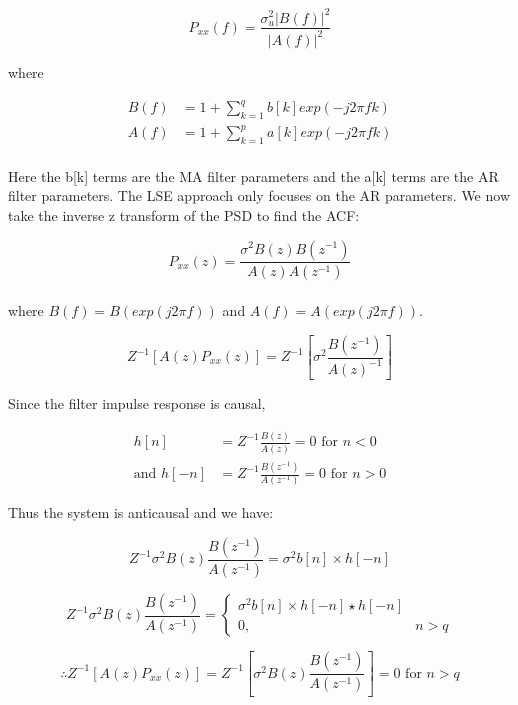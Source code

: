 \documentclass{article}
\begin{document}
\begin{equation}
P_{xx}(f) = \frac{\sigma_u^2|B(f)|^2}{|A(f)|^2}
\end{equation}

where

\begin{align}
B(f) &= 1 + \sum_{k=1}^q {b[k] exp(-j2\pi fk)} \\
A(f) &= 1 + \sum_{k=1}^p {a[k] exp(-j2\pi fk)}
\end{align}
\\
Here the b[k] terms are the MA filter parameters and the a[k] terms are the AR filter parameters. The LSE approach only focuses on the AR parameters. We now take the inverse z transform of the PSD to find the ACF:

\begin{equation}
P_{xx}(z) = \frac{\sigma^2 B(z)B(z^{-1})}{A(z)A(z^{-1})}
\end{equation}
\\
where $B(f)=B(exp(j2\pi f))$ and $A(f)=A(exp(j2\pi f))$.

\begin{equation}
Z^{-1}[A(z)P_{xx}(z)] = Z^{-1} [\sigma^2 \frac{B(z^{-1})}{A(z)^{-1}}]
\end{equation}

Since the filter impulse response is causal,

\begin{align}
h[n] &= Z^{-1} \frac{B(z)}{A(z)} = 0 \text{ for }n<0 \\
\text{and }h[-n] &= Z^{-1} \frac{B(z^{-1})}{A(z^{-1})} = 0 \text{ for }n>0
\end{align}

Thus the system is anticausal and we have:

\begin{equation}
Z^{-1} {\sigma^2 B(z) \frac{B(z^{-1})}{A(z^{-1})}} = \sigma^2 b[n] \times h[-n]
\end{equation}

\begin{equation}
Z^{-1} {\sigma^2 B(z) \frac{B(z^{-1})}{A(z^{-1})}} = 
\begin{cases}
\sigma^2 b[n] \times h[-n] \star h[-n] \\
0, & n>q
\end{cases}
\end{equation}

\begin{equation}
\therefore Z^{-1}[A(z)P_{xx}(z)] = Z^{-1} [{\sigma^2 B(z) \frac{B(z^{-1})}{A(z^{-1})}}] = 0 \text{ for }n>q
\end{equation}
\end{document}
